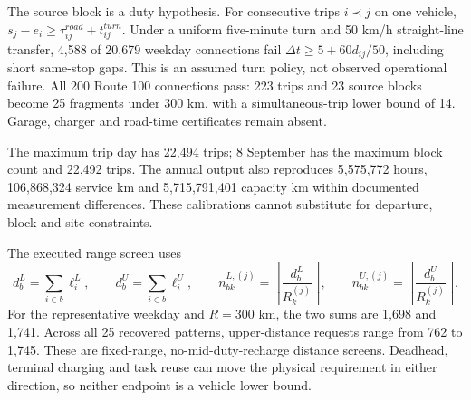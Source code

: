 \documentclass[12pt,letterpaper]{article}
\begin{document}
The source block is a duty hypothesis. For consecutive trips $i\prec j$ on one vehicle, $s_j-e_i\ge\tau^{road}_{ij}+t^{turn}_{ij}$. Under a uniform five-minute turn and 50 km/h straight-line transfer, 4,588 of 20,679 weekday connections fail $\Delta t\ge5+60d_{ij}/50$, including short same-stop gaps. This is an assumed turn policy, not observed operational failure. All 200 Route 100 connections pass: 223 trips and 23 source blocks become 25 fragments under 300 km, with a simultaneous-trip lower bound of 14. Garage, charger and road-time certificates remain absent.

The maximum trip day has 22,494 trips; 8 September has the maximum block count and 22,492 trips. The annual output also reproduces 5,575,772 hours, 106,868,324 service km and 5,715,791,401 capacity km within documented measurement differences. These calibrations cannot substitute for departure, block and site constraints.\cite{gtfs2023,budget2025}

The executed range screen uses
\begin{equation}
d_b^L=\sum_{i\in b}\ell_i^L,\qquad d_b^U=\sum_{i\in b}\ell_i^U,\qquad
n_{bk}^{L,(j)}=\left\lceil\frac{d_b^L}{R_k^{(j)}}\right\rceil,\qquad
n_{bk}^{U,(j)}=\left\lceil\frac{d_b^U}{R_k^{(j)}}\right\rceil.
\end{equation}
For the representative weekday and $R=300$ km, the two sums are 1,698 and 1,741. Across all 25 recovered patterns, upper-distance requests range from 762 to 1,745. These are fixed-range, no-mid-duty-recharge distance screens. Deadhead, terminal charging and task reuse can move the physical requirement in either direction, so neither endpoint is a vehicle lower bound.
\end{document}
